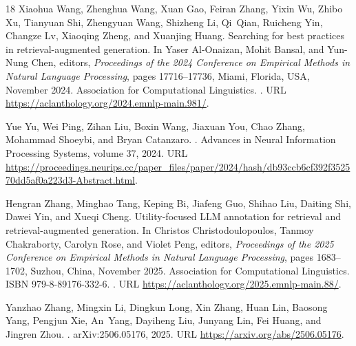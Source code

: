 \begin{thebibliography}{18}
Xiaohua Wang, Zhenghua Wang, Xuan Gao, Feiran Zhang, Yixin Wu, Zhibo Xu,
  Tianyuan Shi, Zhengyuan Wang, Shizheng Li, Qi~Qian, Ruicheng Yin, Changze Lv,
  Xiaoqing Zheng, and Xuanjing Huang.
\newblock Searching for best practices in retrieval-augmented generation.
\newblock In Yaser Al-Onaizan, Mohit Bansal, and Yun-Nung Chen, editors,
  \emph{Proceedings of the 2024 Conference on Empirical Methods in Natural
  Language Processing}, pages 17716--17736, Miami, Florida, USA, November 2024.
  Association for Computational Linguistics.
\newblock {}.
\newblock URL \url{https://aclanthology.org/2024.emnlp-main.981/}.

Yue Yu, Wei Ping, Zihan Liu, Boxin Wang, Jiaxuan You, Chao Zhang, Mohammad
  Shoeybi, and Bryan Catanzaro.
.
\newblock Advances in Neural Information Processing Systems, volume 37, 2024.
\newblock URL
  \url{https://proceedings.neurips.cc/paper_files/paper/2024/hash/db93ccb6cf392f352570dd5af0a223d3-Abstract.html}.

Hengran Zhang, Minghao Tang, Keping Bi, Jiafeng Guo, Shihao Liu, Daiting Shi,
  Dawei Yin, and Xueqi Cheng.
\newblock Utility-focused {LLM} annotation for retrieval and
  retrieval-augmented generation.
\newblock In Christos Christodoulopoulos, Tanmoy Chakraborty, Carolyn Rose, and
  Violet Peng, editors, \emph{Proceedings of the 2025 Conference on Empirical
  Methods in Natural Language Processing}, pages 1683--1702, Suzhou, China,
  November 2025{}. Association for Computational Linguistics.
\newblock ISBN 979-8-89176-332-6.
\newblock {}.
\newblock URL \url{https://aclanthology.org/2025.emnlp-main.88/}.

Yanzhao Zhang, Mingxin Li, Dingkun Long, Xin Zhang, Huan Lin, Baosong Yang,
  Pengjun Xie, An~Yang, Dayiheng Liu, Junyang Lin, Fei Huang, and Jingren Zhou.
.
\newblock arXiv:2506.05176, 2025{}.
\newblock URL \url{https://arxiv.org/abs/2506.05176}.


\end{thebibliography}
